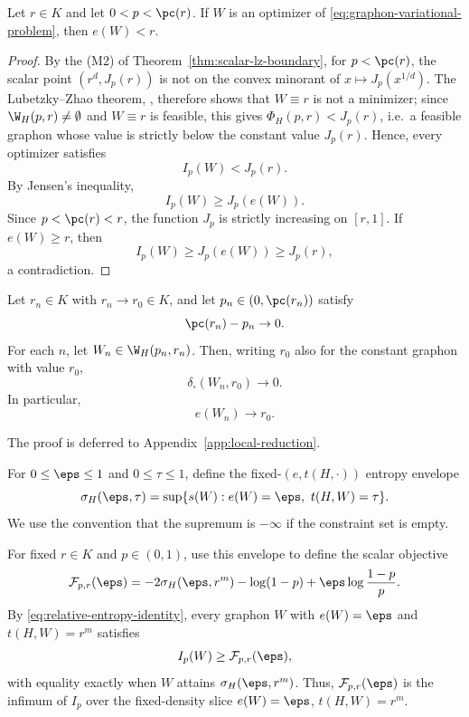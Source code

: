 \begin{lemma}\label{lem:edge-density-deficit}
Let $r\in K$ and let $0<p<\pc(r)$.  If $W$ is an optimizer of \eqref{eq:graphon-variational-problem}, then $e(W)<r$.
\end{lemma}

\begin{proof}
By the (M2) of Theorem~\ref{thm:scalar-lz-boundary}, for $p<\pc(r)$, the scalar point $(r^d,J_p(r))$ is not on the convex minorant of
$x\mapsto J_p(x^{1/d})$.  The Lubetzky--Zhao theorem,
, therefore shows that $W\equiv r$ is not a
minimizer; since $\W_H(p,r)\ne\emptyset$ and $W\equiv r$ is feasible, this
gives $\Phi_H(p,r)<J_p(r)$, i.e.\ a feasible graphon whose value is strictly
below the constant value $J_p(r)$.  Hence, every optimizer satisfies
\[
  I_p(W)<J_p(r).
\]
By Jensen's inequality,
\[
  I_p(W)\ge J_p(e(W)).
\]
Since $p<\pc(r)<r$, the function $J_p$ is strictly increasing on $[r,1]$.  If
$e(W)\ge r$, then
\[
  I_p(W)\ge J_p(e(W))\ge J_p(r),
\]
a contradiction.
\end{proof}

\begin{lemma}\label{lem:boundary-convergence}
Let $r_n\in K$ with $r_n\to r_0\in K$, and let
$p_n\in(0,\pc(r_n))$ satisfy
\[
  \pc(r_n)-p_n\to0.
\]
For each $n$, let $W_n\in\W_H(p_n,r_n)$.  Then, writing $r_0$ also for the constant
graphon with value $r_0$,
\[
  \delta_\square(W_n,r_0)\to0.
\]
In particular,
\[
  e(W_n)\to r_0.
\]
\end{lemma}

The proof is deferred to Appendix~\ref{app:local-reduction}.

For $0\le\eps\le1$ and $0\le\tau\le1$, define the fixed-$(e,t(H,\cdot))$ entropy
envelope
\begin{equation}\label{eq:fixed-density-entropy}
  \sigma_H(\eps,\tau)=
  \sup\{s(W):e(W)=\eps,\ t(H,W)=\tau\}.
\end{equation}
We use the convention that the supremum is $-\infty$ if the constraint set is
empty.

For fixed $r\in K$ and $p\in(0,1)$, use this envelope to define the scalar
objective
\begin{equation}\label{eq:reduced-objective}
  \mathcal F_{p,r}(\eps)=
  -2\sigma_H(\eps,r^m)
  -\log(1-p)+\eps\log\frac{1-p}{p}.
\end{equation}
By \eqref{eq:relative-entropy-identity}, every graphon $W$ with $e(W)=\eps$ and
$t(H,W)=r^m$ satisfies
\[
  I_p(W)\ge \mathcal F_{p,r}(\eps),
\]
with equality exactly when $W$ attains $\sigma_H(\eps,r^m)$.  Thus,
$\mathcal F_{p,r}(\eps)$ is the infimum of $I_p$ over the fixed-density slice
$e(W)=\eps$, $t(H,W)=r^m$.

